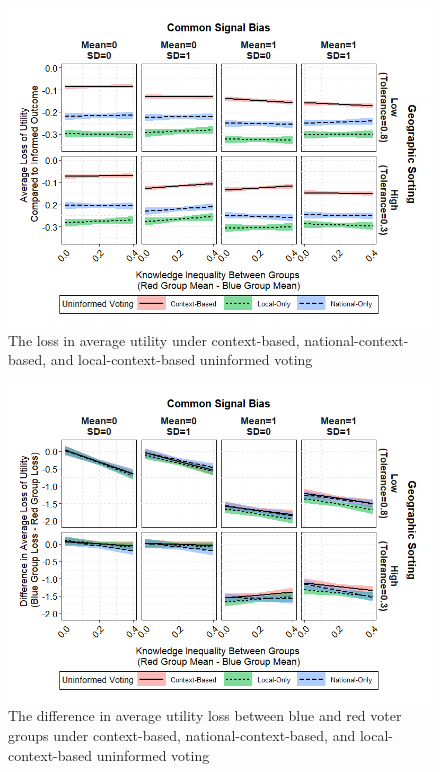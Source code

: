 \begin{figure}[ht!!!]
    \caption{The loss in average utility under context-based, national-context-based, and local-context-based uninformed voting}
    \label{fig:abmres3c}
    \includegraphics[width=\linewidth]{../outputs/abmres3c.png}
\end{figure}

\begin{figure}[ht!!!]
    \caption{The difference in average utility loss between blue and red voter groups under context-based, national-context-based, and local-context-based uninformed voting}
    \label{fig:abmres4c}
    \includegraphics[width=\linewidth]{../outputs/abmres4c.png}
\end{figure}


